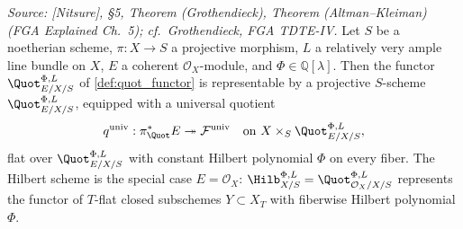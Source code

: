 \begin{theorem}
  \textit{Source: [Nitsure], \S 5, Theorem (Grothendieck), Theorem
  (Altman--Kleiman) (FGA Explained Ch.~5); cf.\ Grothendieck, FGA TDTE-IV.}
  Let \(S\) be a noetherian scheme, \(\pi : X \to S\) a projective morphism,
  \(L\) a relatively very ample line bundle on \(X\), \(E\) a coherent
  \(\mathcal{O}_X\)-module, and \(\Phi \in \mathbb{Q}[\lambda]\). Then the
  functor \(\Quot^{\Phi,L}_{E/X/S}\) of \cref{def:quot_functor} is
  representable by a projective \(S\)-scheme \(\Quot^{\Phi,L}_{E/X/S}\),
  equipped with a universal quotient
  \[
    q^{\mathrm{univ}} :
    \pi^*_{\Quot} E \twoheadrightarrow \mathcal{F}^{\mathrm{univ}}
    \quad \text{on } X \times_S \Quot^{\Phi,L}_{E/X/S},
  \]
  flat over \(\Quot^{\Phi,L}_{E/X/S}\) with constant Hilbert polynomial
  \(\Phi\) on every fiber. The Hilbert scheme is the special case
  \(E = \mathcal{O}_X\): \(\Hilb^{\Phi,L}_{X/S} = \Quot^{\Phi,L}_{\mathcal{O}_X/X/S}\)
  represents the functor of \(T\)-flat closed subschemes
  \(Y \subset X_T\) with fiberwise Hilbert polynomial \(\Phi\).
\end{theorem}

